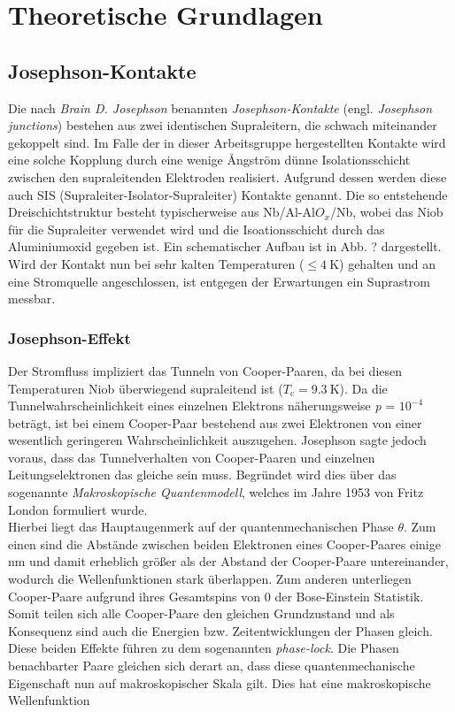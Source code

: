 \chapter{Theoretische Grundlagen}


\section{Josephson-Kontakte}
Die nach \textit{Brain D. Josephson} benannten \textit{Josephson-Kontakte} (engl. \textit{Josephson junctions}) bestehen aus zwei identischen Supraleitern, die schwach miteinander gekoppelt sind. Im Falle der in dieser Arbeitsgruppe hergestellten Kontakte wird eine solche Kopplung durch eine wenige \r{A}ngström dünne Isolationsschicht zwischen den supraleitenden Elektroden realisiert. Aufgrund dessen werden diese auch SIS (Supraleiter-Isolator-Supraleiter) Kontakte genannt. Die so entstehende Dreischichtstruktur besteht typischerweise aus Nb/Al-Al$O_x$/Nb, wobei das Niob für die Supraleiter verwendet wird und die Isoationsschicht durch das Aluminiumoxid gegeben ist. Ein schematischer Aufbau ist in Abb. ? dargestellt. 
Wird der Kontakt nun bei sehr kalten Temperaturen ($\leq 4 \ \mathrm{K}$) gehalten und an eine Stromquelle angeschlossen, ist entgegen der Erwartungen ein Suprastrom messbar.
        
\subsection{Josephson-Effekt}

Der Stromfluss impliziert das Tunneln von Cooper-Paaren, da bei diesen Temperaturen Niob überwiegend supraleitend ist  (${T_\mathrm{c}} = 9.3 \ \mathrm{K}$). Da die Tunnelwahrscheinlichkeit eines einzelnen Elektrons näherungsweise \textit{p} = $10^{-4}$ beträgt, ist bei einem Cooper-Paar bestehend aus zwei Elektronen von einer wesentlich geringeren Wahrscheinlichkeit auszugehen. Josephson sagte jedoch voraus, dass das Tunnelverhalten von Cooper-Paaren und einzelnen Leitungselektronen das gleiche sein muss. Begründet wird dies über das sogenannte \textit{Makroskopische Quantenmodell}, welches im Jahre 1953 von Fritz London formuliert wurde. \\
Hierbei liegt das Hauptaugenmerk auf der quantenmechanischen Phase $\theta$. Zum einen sind die Abstände zwischen beiden Elektronen eines Cooper-Paares einige nm und damit erheblich größer als der Abstand der Cooper-Paare untereinander, wodurch die Wellenfunktionen stark überlappen. Zum anderen unterliegen Cooper-Paare aufgrund ihres Gesamtspins von 0 der Bose-Einstein Statistik. Somit teilen sich alle Cooper-Paare den gleichen Grundzustand und als Konsequenz sind auch die Energien bzw. Zeitentwicklungen der Phasen gleich. Diese beiden Effekte führen zu dem sogenannten \textit{phase-lock}. Die Phasen benachbarter Paare gleichen sich derart an, dass diese quantenmechanische Eigenschaft nun auf makroskopischer Skala gilt. Dies hat eine makroskopische Wellenfunktion 

